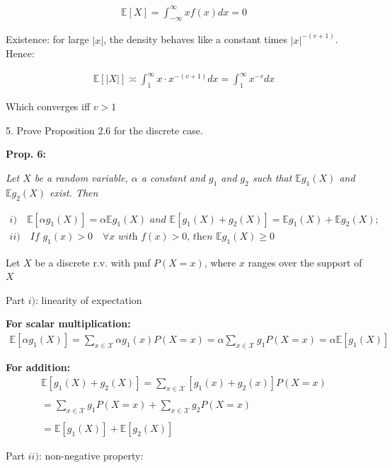\documentclass[10pt]{article}
\begin{document}
\begin{gather*}
    \mathbb{E}[X] = \int_{-\infty}^{\infty}xf(x) dx = 0
\end{gather*}

Existence: for large $|x|$, the density behaves like a constant times $|x|^{-(v+1)}$. Hence: 

\begin{gather*}
    \mathbb{E}[|X|] \asymp \int_{1}^{\infty}x \cdot x^{-(v + 1)} dx = \int_{1}^{\infty}x^{-v} dx
\end{gather*}

Which converges iff $v > 1$

\newpage

5. Prove Proposition 2.6 for the discrete case.

\textbf{Prop. 6: }

\textit{Let $X$ be a random variable, $\alpha$ a constant and $g_1$ and $g_2$ such that $\mathbb{E}g_1(X)$ and $\mathbb{E}g_2(X)$ exist. Then}

\begin{gather*}
    i)\quad \mathbb{E}[\alpha g_1(X)] = \alpha\mathbb{E}g_1(X) \textit{ and } \mathbb{E}[g_1(X) + g_2(X)] = \mathbb{E}g_1(X) + \mathbb{E}g_2(X);\\
    ii) \quad \textit{If $g_1(x) > 0 \quad\forall x$ with $f(x) > 0$, then $\mathbb{E}g_1(X) \geq 0$}
\end{gather*}

Let $X$ be a discrete r.v. with pmf $P(X = x)$, where $x$ ranges over the support of $X$

Part $i)$: linearity of expectation 

\textbf{For scalar multiplication:}
\begin{gather*}
    \mathbb{E}[\alpha g_1(X)] = \sum_{x \in \mathcal{X}}\alpha g_1(x) P(X = x) = \alpha \sum_{x \in \mathcal{X}}g_1 P(X = x) = \alpha\mathbb{E}[g_1(X)]
\end{gather*}

\textbf{For addition:}
\begin{gather*}
    \mathbb{E}[g_1(X) + g_2(X)] = \sum_{x \in \mathcal{X}}[g_1(x) + g_2(x)]P(X = x) \\
    \\
    = \sum_{x \in \mathcal{X}}g_1 P(X = x) + \sum_{x \in \mathcal{X}}g_2 P(X = x) \\
    \\
    = \mathbb{E}[g_1(X)] + \mathbb{E}[g_2(X)]
\end{gather*}

Part $ii)$: non-negative property: 
\end{document}
